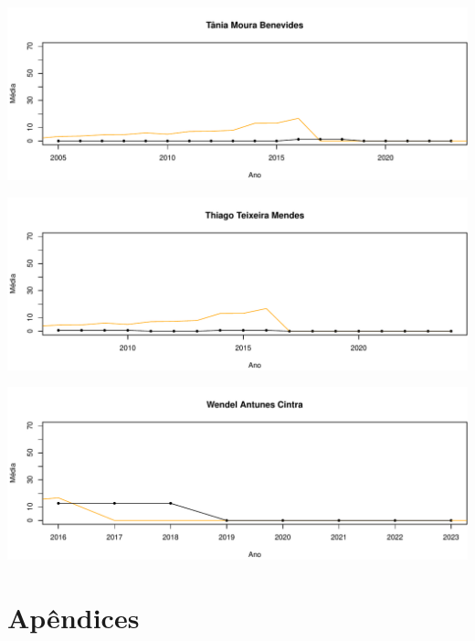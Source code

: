 \documentclass[12pt,brazil]{article}\usepackage[]{graphicx}\usepackage[]{xcolor}
\makeatletter
\def\maxwidth{ %
  \ifdim\Gin@nat@width>\linewidth
    \linewidth
  \else
    \Gin@nat@width
  \fi
}
\makeatother
\begin{document}
\vspace{0.5cm}


{\centering \includegraphics[width=\maxwidth]{figure/mediamovel-59} 

}



\vspace{0.5cm}


{\centering \includegraphics[width=\maxwidth]{figure/mediamovel-60} 

}



\vspace{0.5cm}


{\centering \includegraphics[width=\maxwidth]{figure/mediamovel-61} 

}



\vspace{0.5cm}


\clearpage

\section{Apêndices}
\end{document}
